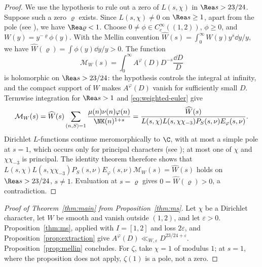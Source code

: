 \begin{proof}
We use the hypothesis to rule out a zero of $L(s,\chi)$ in
$\Rea s>23/24$. Suppose such a zero $\varrho$ exists. Since $L(s,\chi)\ne0$ on $\Rea s\ge1$,
apart from the pole (see \cite[Chapters~13 and~14]{Dav00}), we have $\Rea\varrho<1$.
Choose $0\ne\phi\in C_c^\infty((1,2))$, $\phi\ge0$, and
$W(y)=y^{-\varrho}\phi(y)$.
With the Mellin convention
$\widehat W(s)=\int_0^\infty W(y)y^s\dd y/y$, we have
$\widehat W(\varrho)=\int\phi(y)\dd y/y>0$.
The function
\[
 \mathcal M_W(s)=\int_0^\infty A^\varphi(D)D^{-s}\frac{\dd D}{D}
\]
is holomorphic on $\Rea s>23/24$: the hypothesis
controls the integral at infinity, and
the compact support of $W$ makes $A^\varphi(D)$ vanish for sufficiently
small $D$. Termwise integration for $\Rea s>1$ and \eqref{eq:weighted-euler} give
\[
 \mathcal M_W(s)
 =\widehat W(s)\sum_{(n,S)=1}\frac{\mu(n)\nu(n)\varphi(n)}{\NK(n)^{1+s}}
 =\frac{\widehat W(s)}{L(s,\chi)L(s,\chi\chi_{-3})P_S(s,\nu)E_\varphi(s,\nu)}.
\]
Dirichlet $L$-functions continue meromorphically to $\C$, with at most a simple pole at $s=1$,
which occurs only for principal characters (see \cite[Chapters~8 and~9]{Dav00}); at most one of
$\chi$ and $\chi\chi_{-3}$ is principal. The identity theorem therefore shows that
$L(s,\chi)L(s,\chi\chi_{-3})P_S(s,\nu)E_\varphi(s,\nu)\mathcal M_W(s)=\widehat W(s)$ holds on
$\Rea s>23/24$, $s\ne1$.
Evaluation at $s=\varrho$ gives $0=\widehat W(\varrho)>0$, a contradiction.
\end{proof}

\begin{proof}[Proof of Theorem~\ref{thm:main} from Proposition~\ref{thm:ms}]
Let $\chi$ be a Dirichlet character, let $W$ be smooth and vanish outside $(1,2)$, and let
$\varepsilon>0$. Proposition~\ref{thm:ms}, applied with $I=[1,2]$ and loss $2\varepsilon$, and
Proposition~\ref{prop:extraction} give $A^\varphi(D)\ll_{W,\varepsilon}D^{23/24+\varepsilon}$.
Proposition~\ref{prop:mellin} concludes. For $\zeta$, take $\chi=1$ of modulus $1$; at $s=1$,
where the proposition does not apply, $\zeta(1)$ is a pole, not a zero.
\end{proof}

